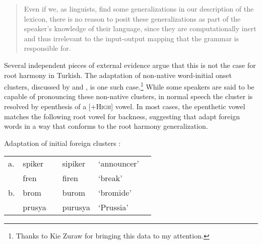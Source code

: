 \begin{quote}
Even if we, as linguists, find some generalizations in our description of the lexicon, there is no reason to posit these generalizations as part of the speaker's knowledge of their language, since they are computationally inert and thus irrelevant to the input-output mapping that the grammar is responsible for. \citep[][18]{PE}
\end{quote}

Several independent pieces of external evidence argue that this is not the case for root harmony in Turkish. 
The adaptation of non-native word-initial onset clusters, discussed by \citet{Clements1982} and \citet{Kaun1999}, is one such case.\footnote{Thanks to Kie Zuraw for bringing this data to my attention.} While some speakers are said to be capable of pronouncing these non-native clusters, in normal speech the cluster is resolved by epenthesis of a [$+$\textsc{High}] vowel. In most cases, the epenthetic vowel matches the following root vowel for backness, suggesting that adapt foreign words in a way that conforms to the root harmony generalization.


\begin{example}
Adaptation of initial foreign clusters \citep[][247]{Clements1982}: 

\begin{tabular}{l l l l l l}
a. & spiker  & \alt{} & sipiker  & `announcer' \\
   & fren    & \alt{} & firen    & `break'     \\
b. & brom    & \alt{} & burom    & `bromide'   \\
   & prusya  & \alt{} & purusya  & `Prussia'   \\
\end{tabular}
\end{example}

